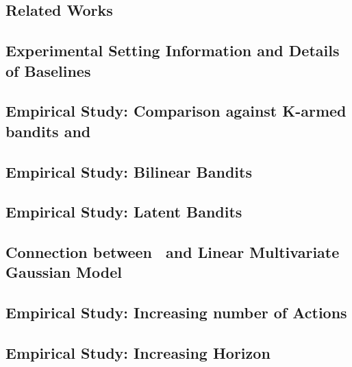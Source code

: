 



\subsection{Related Works}
\label{sec:related}



\subsection{Experimental Setting Information and Details of Baselines}
\label{sec:addl-expt}



\subsection{Empirical Study: Comparison against K-armed bandits and \dpt}
\label{sec:k_arms_dpt}



\subsection{Empirical Study: Bilinear Bandits}
\label{sec:bilinear}



\subsection{Empirical Study: Latent Bandits}
\label{sec:latent}


\subsection{Connection between \pred\ and Linear Multivariate Gaussian Model}
\label{sec:und}



\subsection{Empirical Study: Increasing number of Actions}
\label{sec:lim}




\subsection{Empirical Study: Increasing Horizon}
\label{sec:horizon}



